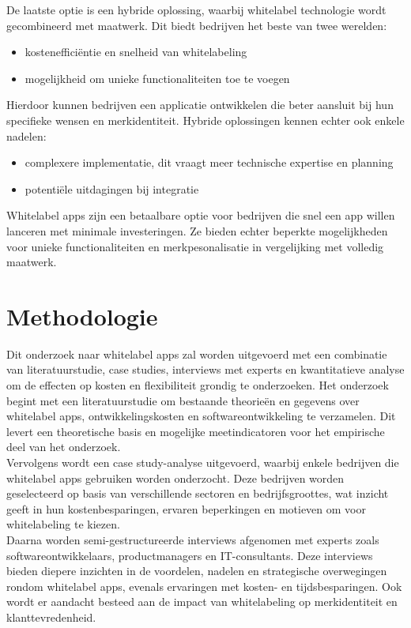 De laatste optie is een hybride oplossing, waarbij whitelabel technologie wordt gecombineerd met maatwerk.
Dit biedt bedrijven het beste van twee werelden:
\begin{itemize}
  \item kostenefficiëntie en snelheid van whitelabeling
  \item mogelijkheid om unieke functionaliteiten toe te voegen
\end{itemize}
Hierdoor kunnen bedrijven een applicatie ontwikkelen die beter aansluit bij hun specifieke wensen en merkidentiteit.
Hybride oplossingen kennen echter ook enkele nadelen:
\begin{itemize}
  \item complexere implementatie, dit vraagt meer technische expertise en planning
  \item potentiële uitdagingen bij integratie
\end{itemize}

Whitelabel apps zijn een betaalbare optie voor bedrijven die snel een app willen lanceren met minimale investeringen.
Ze bieden echter beperkte mogelijkheden voor unieke functionaliteiten en merkpesonalisatie in vergelijking met volledig maatwerk.
\section{Methodologie}%
\label{sec:methodologie}

Dit onderzoek naar whitelabel apps zal worden uitgevoerd met een combinatie van literatuurstudie, case studies, interviews met experts en kwantitatieve analyse om de effecten op kosten en flexibiliteit grondig te onderzoeken.
Het onderzoek begint met een literatuurstudie om bestaande theorieën en gegevens over whitelabel apps, ontwikkelingskosten en softwareontwikkeling te verzamelen. 
Dit levert een theoretische basis en mogelijke meetindicatoren voor het empirische deel van het onderzoek. \\

Vervolgens wordt een case study-analyse uitgevoerd, waarbij enkele bedrijven die whitelabel apps gebruiken worden onderzocht. 
Deze bedrijven worden geselecteerd op basis van verschillende sectoren en bedrijfsgroottes, wat inzicht geeft in hun kostenbesparingen, ervaren beperkingen en motieven om voor whitelabeling te kiezen.\\

Daarna worden semi-gestructureerde interviews afgenomen met experts zoals softwareontwikkelaars, productmanagers en IT-consultants. 
Deze interviews bieden diepere inzichten in de voordelen, nadelen en strategische overwegingen rondom whitelabel apps, evenals ervaringen met kosten- en tijdsbesparingen. 
Ook wordt er aandacht besteed aan de impact van whitelabeling op merkidentiteit en klanttevredenheid.\\

